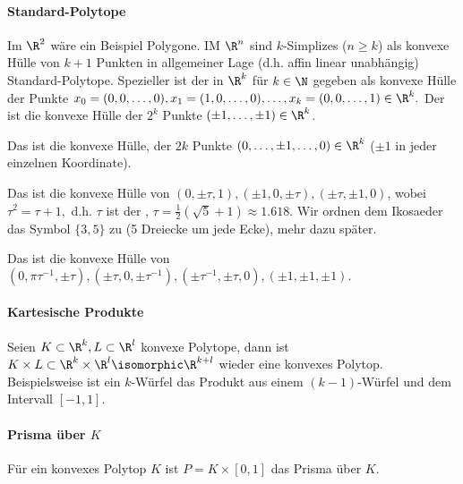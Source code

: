 \paragraph{Standard-Polytope}
Im $\R^2$ wäre ein Beispiel Polygone.
IM $\R^n$ sind $k$-Simplizes ($n \ge k$) als konvexe Hülle von $k + 1$ Punkten in allgemeiner Lage (d.h. affin linear unabhängig) Standard-Polytope.
Spezieller ist der  in $\R^k$ für $k \in \N$ gegeben als konvexe Hülle der Punkte
\begin{math}
    x_0 = (0, 0, \dotsc, 0),
    x_1 = (1, 0, \dotsc, 0), \dotsc,
    x_k = (0, 0, \dotsc, 1) \in \R^k.
\end{math}
Der  ist die konvexe Hülle der $2^k$ Punkte $(\pm 1, \dotsc, \pm 1) \in \R^k$.

Das  ist die konvexe Hülle, der $2k$ Punkte $(0, \dotsc, \pm 1, \dotsc, 0) \in \R^k$ ($\pm 1$ in jeder einzelnen Koordinate).

Das  ist die konvexe Hülle von $(0,\pm \tau, 1), (\pm 1, 0, \pm \tau), (\pm \tau, \pm 1, 0)$, wobei
\begin{math}
    \tau^2 = \tau + 1,
\end{math}
d.h. $\tau$ ist der , $\tau = \frac{1}{2}(\sqrt 5 + 1) \approx 1.618$.
Wir ordnen dem Ikosaeder das Symbol $\{3,5\}$ zu (5 Dreiecke um jede Ecke), mehr dazu später.

Das  ist die konvexe Hülle von
\begin{math}
    (0, \pi \tau^{-1}, \pm \tau),
    (\pm \tau, 0, \pm \tau^{-1}),
    (\pm \tau^{-1}, \pm \tau, 0),
    (\pm 1, \pm 1, \pm 1).
\end{math}

\paragraph{Kartesische Produkte}
Seien $K \subset \R^k, L \subset \R^l$ konvexe Polytope, dann ist
\begin{math}
    K \times L \subset \R^k \times \R^l \isomorphic \R^{k+l}
\end{math}
wieder eine konvexes Polytop.
Beispielsweise ist ein $k$-Würfel das Produkt aus einem $(k-1)$-Würfel und dem Intervall $[-1,1]$.

\paragraph{Prisma über $K$}
Für ein konvexes Polytop $K$ ist $P = K \times [0,1]$ das Prisma über $K$.

